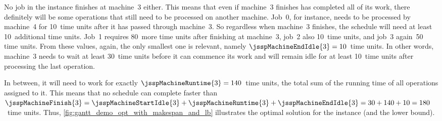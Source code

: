 No job in the  instance finishes at machine~3 either.
This means that even if machine~3 finishes has completed all of its work, there definitely will be some operations that still need to be processed on another machine.
Job~0, for instance, needs to be processed by machine~4 for 10~time units after it has passed through machine~3.
So regardless when machine~3 finishes, the schedule will need at least 10~additional time units.
Job~1 requires 80~more time units after finishing at machine~3, job~2 also 10~time units, and job~3 again~50 time units.
From these values, again, the only smallest one is relevant, namely $\jsspMachineEndIdle{3}=10$~time units.
In other words, machine~3 needs to wait at least 30~time units before it can commence its work and will remain idle for at least 10~time units after processing the last operation.

In between, it will need to work for exactly $\jsspMachineRuntime{3}=140$~time units, the total sum of the running time of all operations assigned to it.
This means that no schedule can complete faster than $\jsspMachineFinish{3}=\jsspMachineStartIdle{3}+\jsspMachineRuntime{3}+\jsspMachineEndIdle{3}=30+140+10=180$~time units.
Thus, \autoref{fig:gantt_demo_opt_with_makespan_and_lb} illustrates the optimal solution for the  instance (and the lower bound).

